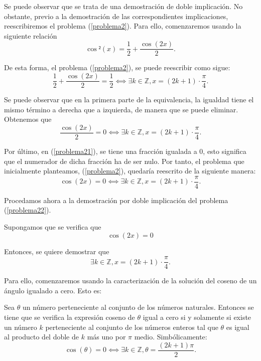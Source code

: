 \begin{demostracion}
  Se puede observar que se trata de una demostración de doble
  implicación. No obstante, previo a la demostración de las
  correspondientes implicaciones, reescribiremos el problema
  (\ref{problema2}). Para ello, comenzaremos usando la siguiente
  relación
  \begin{equation}
    \cos²(x) = \frac{1}{2} + \frac{\cos(2x)}{2}.
  \end{equation}

  De esta forma, el problema (\ref{problema2}), se puede reescribir como
  sigue:
  \begin{equation}
    \frac{1}{2} + \frac{\cos(2x)}{2} = \frac{1}{2} ⟺
    ∃ k ∈ ℤ, x = (2k + 1) ⋅ \frac{π}{4}.
  \end{equation}

  Se puede observar que en la primera parte de la equivalencia, la
  igualdad tiene el mismo término a derecha que a izquierda, de manera
  que se puede eliminar. Obtenemos que
  \begin{equation}\label{problema21}
    \frac{\cos(2x)}{2} = 0 ⟺ ∃ k ∈ ℤ, x = (2k+1) ⋅ \frac{π}{4}.
  \end{equation}

  Por último, en (\ref{problema21}), se tiene una fracción igualada a 0,
  esto significa que el numerador de dicha fracción ha de ser nulo. Por
  tanto, el problema que inicialmente planteamos, (\ref{problema2}),
  quedaría reescrito de la siguiente manera:
  \begin{equation}\label{problema22}
    \cos(2x) = 0  ⟺ ∃ k ∈ ℤ, x = (2k+1) ⋅ \frac{π}{4}.
  \end{equation}

  Procedamos ahora a la demostración por doble implicación del
  problema (\ref{problema22}).

  \noindent
  \framebox{\longrightarrow} Supongamos que se verifica que
  \begin{equation}\label{Dobleh2}\tag{h1}
    \cos(2x) = 0
  \end{equation}

  Entonces, se quiere demostrar que
  \begin{equation}\label{ConcDoble}
    ∃ k ∈ ℤ, x = (2k+1) ⋅ \frac{π}{4}.
  \end{equation}

  Para ello, comenzaremos usando la caracterización de la solución del
  coseno de un ángulo igualado a cero. Esto es:

  \begin{proposicion}\label{alpha}
    Sea \(θ\) un número perteneciente al conjunto de los
    números naturales. Entonces se tiene que se verifica la
    expresión coseno de \(θ\) igual a cero si y solamente si
    existe un número \(k\) perteneciente al conjunto de los
    números enteros tal que \(θ\) es igual al producto del
    doble de \(k\) más uno por \(π\) medio. Simbólicamente:
  \begin{equation}\label{alpha2}
    \cos(θ) = 0 ⟺ ∃ k ∈ ℤ,  θ = \frac{(2k+1)π}{2}.
  \end{equation}
  \end{proposicion}


\end{demostracion}
